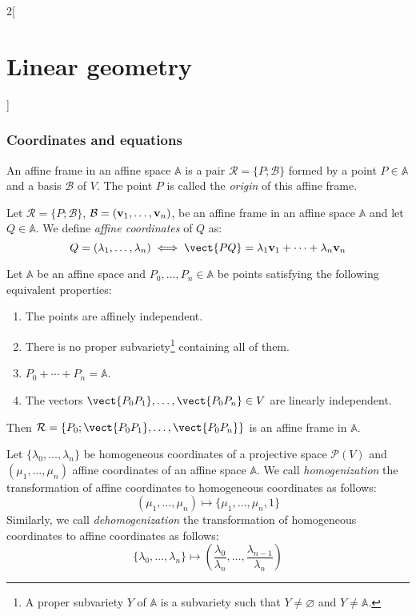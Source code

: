 \documentclass[../../../main.tex]{subfiles}
\begin{document}
\begin{multicols}{2}[\section{Linear geometry}]
  \subsubsection{Coordinates and equations}
  \begin{definition}
    An affine frame in an affine space $\mathbb{A}$ is a pair $\mathcal{R}=\{P;\mathcal{B}\}$ formed by a point $P\in\mathbb{A}$ and a basis $\mathcal{B}$ of $V$. The point $P$ is called the \emph{origin} of this affine frame.
  \end{definition}
  \begin{definition}
    Let $\mathcal{R}=\{P;\mathcal{B}\}$, $\mathcal{B}=(\boldsymbol{\mathrm{v}}_1,\ldots,\boldsymbol{\mathrm{v}}_n)$, be an affine frame in an affine space $\mathbb{A}$ and let $Q\in\mathbb{A}$. We define \emph{affine coordinates} of $Q$ as: $$Q=(\lambda_1,\ldots,\lambda_n)\iff\vect{PQ}=\lambda_1\vf{v}_1+\cdots+\lambda_n\vf{v}_n$$
  \end{definition}
  \begin{proposition}
    Let $\mathbb{A}$ be an affine space and $P_0,\ldots,P_n\in\mathbb{A}$ be points satisfying the following equivalent properties:
    \begin{enumerate}
      \item The points are affinely independent.
      \item There is no proper subvariety\footnote{A proper subvariety $Y$ of $\mathbb{A}$ is a subvariety such that $Y\ne\varnothing$ and  $Y\ne\mathbb{A}$.} containing all of them.
      \item $P_0+\cdots+P_n=\mathbb{A}$.
      \item The vectors $\vect{P_0P_1},\ldots,\vect{P_0P_n}\in V$ are linearly independent.
    \end{enumerate}
    Then $\mathcal{R}=\{P_0;\vect{P_0P_1},\ldots,\vect{P_0P_n}\}$ is an affine frame in $\mathbb{A}$.
  \end{proposition}
  \begin{definition}
    Let $\{\lambda_0,\ldots,\lambda_n\}$ be homogeneous coordinates of a projective space $\mathcal{P}(V)$ and $(\mu_1,\ldots,\mu_n)$ affine coordinates of an affine space $\mathbb{A}$. We call \emph{homogenization} the transformation of affine coordinates to homogeneous coordinates as follows: $$(\mu_1,\ldots,\mu_n)\longmapsto\{\mu_1,\ldots,\mu_n,1\}$$ Similarly, we call \emph{dehomogenization} the transformation of homogeneous coordinates to affine coordinates as follows: $$\{\lambda_0,\ldots,\lambda_n\}\longmapsto\left(\frac{\lambda_0}{\lambda_n},\ldots,\frac{\lambda_{n-1}}{\lambda_n}\right)$$

\end{definition}
\end{multicols}
\end{document}
